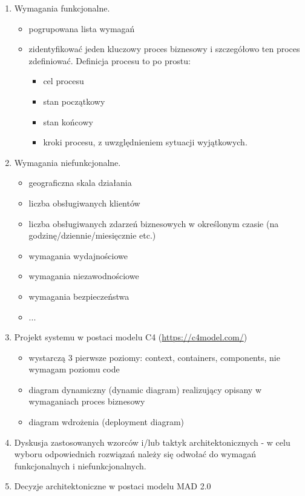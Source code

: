 \documentclass[12pt]{article}
\begin{document}
\begin{enumerate}
    \item Wymagania funkcjonalne.
    \begin{itemize}
        \item pogrupowana lista wymagań
        \item zidentyfikować jeden kluczowy proces biznesowy i szczegółowo ten proces zdefiniować. Definicja procesu to po prostu:
        \begin{itemize}
            \item cel procesu
            \item stan początkowy
            \item stan końcowy
            \item kroki procesu, z uwzględnieniem sytuacji wyjątkowych.
        \end{itemize}
    \end{itemize}
    
    \item Wymagania niefunkcjonalne.
    \begin{itemize}
        \item geograficzna skala działania
        \item liczba obsługiwanych klientów
        \item liczba obsługiwanych zdarzeń biznesowych w określonym czasie (na godzinę/dziennie/miesięcznie etc.)
        \item wymagania wydajnościowe
        \item wymagania niezawodnościowe
        \item wymagania bezpieczeństwa
        \item ...
    \end{itemize}
    
    \item Projekt systemu w postaci modelu C4 (\url{https://c4model.com/})
    \begin{itemize}
        \item wystarczą 3 pierwsze poziomy: context, containers, components, nie wymagam poziomu code
        \item diagram dynamiczny (dynamic diagram) realizujący opisany w wymaganiach proces biznesowy
        \item diagram wdrożenia (deployment diagram)
    \end{itemize}
    
    \item Dyskusja zastosowanych wzorców i/lub taktyk architektonicznych - w celu wyboru odpowiednich rozwiązań należy się odwołać do wymagań funkcjonalnych i niefunkcjonalnych.
    
    \item Decyzje architektoniczne w postaci modelu MAD 2.0
\end{enumerate}
\end{document}
